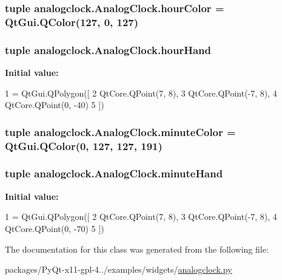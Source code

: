 \subsubsection[{hour\+Color}]{\setlength{\rightskip}{0pt plus 5cm}tuple analogclock.\+Analog\+Clock.\+hour\+Color = Qt\+Gui.\+Q\+Color(127, 0, 127)\hspace{0.3cm}{\ttfamily [static]}}\label{classanalogclock_1_1AnalogClock_aacce5fc84431002d5bab1ccbcbbaf6d5}
\hypertarget{classanalogclock_1_1AnalogClock_aec808658ddb5edfa02d5071ee9080c92}{}
\subsubsection[{hour\+Hand}]{\setlength{\rightskip}{0pt plus 5cm}tuple analogclock.\+Analog\+Clock.\+hour\+Hand\hspace{0.3cm}{\ttfamily [static]}}\label{classanalogclock_1_1AnalogClock_aec808658ddb5edfa02d5071ee9080c92}
{\bfseries Initial value\+:}
\begin{DoxyCode}
1 = QtGui.QPolygon([
2         QtCore.QPoint(7, 8),
3         QtCore.QPoint(-7, 8),
4         QtCore.QPoint(0, -40)
5     ])
\end{DoxyCode}
\hypertarget{classanalogclock_1_1AnalogClock_acd823721a1d3496fae27926bb1a621b6}{}
\subsubsection[{minute\+Color}]{\setlength{\rightskip}{0pt plus 5cm}tuple analogclock.\+Analog\+Clock.\+minute\+Color = Qt\+Gui.\+Q\+Color(0, 127, 127, 191)\hspace{0.3cm}{\ttfamily [static]}}\label{classanalogclock_1_1AnalogClock_acd823721a1d3496fae27926bb1a621b6}
\hypertarget{classanalogclock_1_1AnalogClock_a082bdde729509852c8c1ea9f37405527}{}
\subsubsection[{minute\+Hand}]{\setlength{\rightskip}{0pt plus 5cm}tuple analogclock.\+Analog\+Clock.\+minute\+Hand\hspace{0.3cm}{\ttfamily [static]}}\label{classanalogclock_1_1AnalogClock_a082bdde729509852c8c1ea9f37405527}
{\bfseries Initial value\+:}
\begin{DoxyCode}
1 = QtGui.QPolygon([
2         QtCore.QPoint(7, 8),
3         QtCore.QPoint(-7, 8),
4         QtCore.QPoint(0, -70)
5     ])
\end{DoxyCode}


The documentation for this class was generated from the following file\+:\begin{DoxyCompactItemize}
\item 
packages/\+Py\+Qt-\/x11-\/gpl-\/4../examples/widgets/\hyperlink{widgets_2analogclock_8py}{analogclock.\+py}\end{DoxyCompactItemize}
